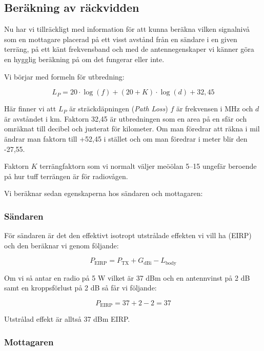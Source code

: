 \documentclass[12ypt,swedish,a4paper]{report}
\begin{document}
\subsection{Beräkning av räckvidden}

Nu har vi tillräckligt med information för att kunna beräkna vilken signalnivå som en mottagare placerad på ett visst avstånd från en sändare i en given terräng, på ett känt frekvensband och med de antennegenskaper vi känner göra en hygglig beräkning på om det fungerar eller inte.

Vi börjar med formeln för utbredning:

\begin{equation}
L_P = 20\cdot\log(f)+(20+K)\cdot\log(d)+32,45
\end{equation}

Här finner vi att $L_P$ är sträckdäpningen (\textit{Path Loss}) $f$ är frekvensen i MHz och $d$ är avståndet i km. Faktorn 32,45 är utbredningen som en area på en sfär och omräknat till decibel och justerat för kilometer. Om man föredrar att räkna i mil ändrar man faktorn till +52,45 i stället och om man föredrar i meter blir den -27,55.

Faktorn $K$ terrängfaktorn som vi normalt väljer meöölan 5--15 ungefär beroende på hur tuff terrängen är för radiovågen.

Vi beräknar sedan egenskaperna hos sändaren och mottagaren:

\subsubsection{Sändaren}

För sändaren är det den effektivt isotropt utstrålade effekten vi vill ha (EIRP) och den beräknar vi genom följande:

\begin{equation}
P_{\mathrm{EIRP}}=P_{\mathrm{TX}} + G_{\mathrm{dBi}} - L_{\mathrm{body}}
\end{equation}

Om vi så antar en radio på 5 W vilket är 37 dBm och en antennvinst på 2 dB samt en kroppsförlust på 2 dB så får vi följande:

\begin{equation}
P_{\mathrm{EIRP}}=37 + 2 - 2 = 37
\end{equation}

Utstrålad effekt är alltså 37 dBm EIRP.

\subsubsection{Mottagaren}
\end{document}
